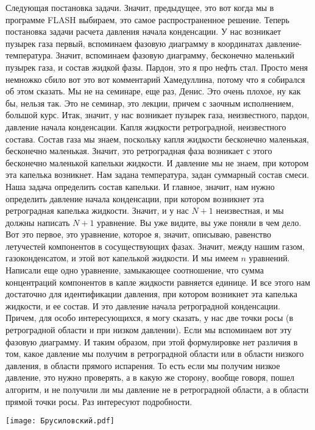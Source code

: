\documentclass[main.tex]{subfiles}
\begin{document}
Следующая постановка задачи.
Значит, предыдущее, это вот когда мы в программе FLASH выбираем, это самое распространенное решение.
Теперь постановка задачи расчета давления начала конденсации.
У нас возникает пузырек газа первый, вспоминаем фазовую диаграмму в координатах давление-температура.
Значит, вспоминаем фазовую диаграмму, бесконечно маленький пузырек газа, и состав жидкой фазы.
Пардон, это я про нефть стал.
Просто меня немножко сбило вот это вот комментарий Хамедуллина, потому что я собирался об этом сказать.
Мы не на семинаре, еще раз, Денис.
Это очень плохое, ну как бы, нельзя так.
Это не семинар, это лекции, причем с заочным исполнением, большой курс.
Итак, значит, у нас возникает пузырек газа, неизвестного, пардон, давление начала конденсации.
Капля жидкости ретроградной, неизвестного состава.
Состав газа мы знаем, поскольку капля жидкости бесконечно маленькая, бесконечно маленькая.
Значит, это ретроградная фаза возникает с этого бесконечно маленькой капельки жидкости.
И давление мы не знаем, при котором эта капелька возникнет.
Нам задана температура, задан суммарный состав смеси.
Наша задача определить состав капельки.
И главное, значит, нам нужно определить давление начала конденсации, при котором возникнет эта ретроградная капелька жидкости.
Значит, и у нас $N+1$ неизвестная, и мы должны написать $N+1$ уравнение.
Вы уже видите, вы уже поняли в чем дело.
Вот это первое, это уравнение, которое я, значит, описываю, равенство летучестей компонентов в сосуществующих фазах.
Значит, между нашим газом, газоконденсатом, и этой вот капелькой жидкости.
И мы имеем $n$ уравнений.
Написали еще одно уравнение, замыкающее соотношение, что сумма концентраций компонентов в капле жидкости равняется единице.
И все этого нам достаточно для идентификации давления, при котором возникнет эта капелька жидкости, и ее состав.
И это давление начала ретроградной конденсации.
Причем, для особо интересующихся, я могу сказать, у нас две точки росы (в ретроградной области и при низком давлении).
Если мы вспоминаем вот эту фазовую диаграмму.
И таким образом, при этой формулировке нет различия в том, какое давление мы получим в ретроградной области или в области низкого давления, в области прямого испарения.
То есть если мы получим низкое давление, это нужно проверять, а в какую же сторону, вообще говоря, пошел алгоритм, и не получили ли мы давление не в ретроградной области, а в области прямой точки росы.
Раз интересуют подробности.

\begin{center}
\texttt{[image: Брусиловский.pdf]}
\end{center}
\end{document}
